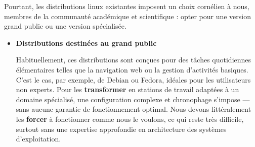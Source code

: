 Pourtant, les distributions linux existantes imposent un choix cornélien à nous, membres de la communauté académique et scientifique : opter pour une version grand public ou une version spécialisée.
\begin{itemize}[leftmargin=*,nosep]
    \item \textbf{Distributions destinées au grand public} 

   Habituellement, ces distributions sont conçues pour des tâches quotidiennes élémentaires telles que la navigation web ou la gestion d’activités basiques. C’est le cas, par exemple, de Debian ou Fedora, idéales pour les utilisateurs non experts.
Pour les \textbf{transformer}  en stations de travail adaptées à un domaine spécialisé, une configuration complexe et chronophage s’impose — sans aucune garantie de fonctionnement optimal. Nous devons littéralement les \textbf{forcer} à fonctionner comme nous le voulons, ce qui reste très difficile, surtout sans une expertise approfondie en architecture des systèmes d’exploitation.


\end{itemize}
